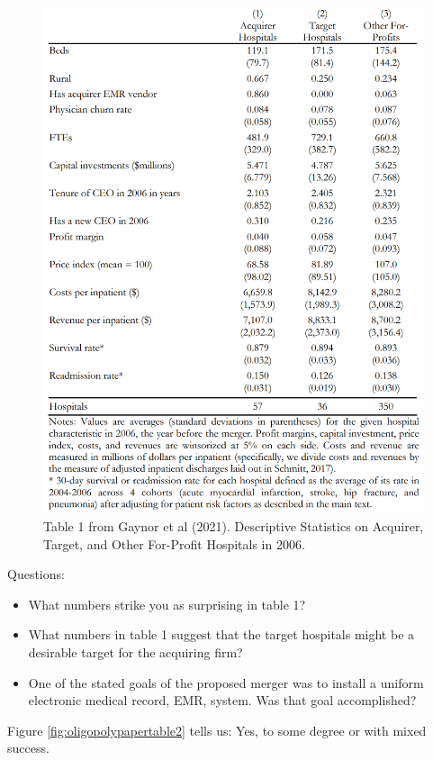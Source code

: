 \documentclass[
]{book}
\providecommand{\tightlist}{%
  \setlength{\itemsep}{0pt}\setlength{\parskip}{0pt}}
\begin{document}
\begin{figure}

{\centering \includegraphics[width=0.8\linewidth]{img/oligopoly/papertable1} 

}

\caption{Table 1 from Gaynor et al (2021). Descriptive Statistics on Acquirer, Target, and Other For-Profit Hospitals in 2006.}\label{fig:oligopolypapertable1}
\end{figure}

Questions:

\begin{itemize}
\tightlist
\item
  What numbers strike you as surprising in table 1?
\item
  What numbers in table 1 suggest that the target hospitals might be a desirable target for the
  acquiring firm?
\item
  One of the stated goals of the proposed merger was to install a uniform electronic medical record, EMR, system. Was that goal accomplished?
\end{itemize}

Figure \ref{fig:oligopolypapertable2} tells us: Yes, to some degree or with mixed success.
\end{document}
